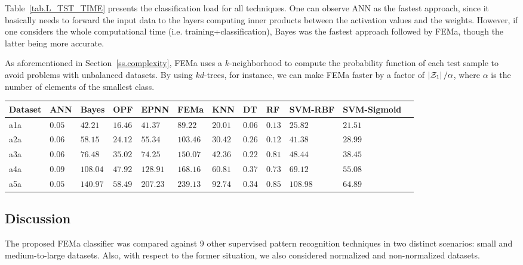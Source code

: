 Table~\ref{tab.L_TST_TIME} presents the classification load for all techniques. One can observe ANN as the fastest approach, since it basically needs to forward the input data to the layers computing inner products between the activation values and the weights. However, if one considers the whole computational time (i.e. training+classification), Bayes was the fastest approach followed by FEMa, though the latter being more accurate.

As aforementioned in Section~\ref{ss.complexity}, FEMa uses a $k$-neighborhood to compute the probability function of each test sample to avoid problems with unbalanced datasets. By using $kd$-trees, for instance, we can make FEMa faster by a factor of $\left|{\cal Z}_1\right|/\alpha$, where $\alpha$ is the number of elements of the smallest class.

\begin{table*}[!htb]
\begin{center}
\caption{\label{tab.L_TST_TIME}Testing time concerning the medium-to-large datasets.}
\scriptsize
\begin{tabular}{l||lllllllllll}
Dataset & ANN   & Bayes     & OPF     & EPNN     & FEMa     & KNN     &      DT  &  RF    & SVM-RBF & SVM-Sigmoid     \\ \hline \hline
a1a& $ 0.05$    & $ 42.21$  & $ 16.46$& $ 41.37$ & $ 89.22$ & $ 20.01$& $0.06$   & $0.13$ & $ 25.82$& $21.51$  \\ 
a2a& $ 0.06$    & $ 58.15$  & $ 24.12$& $ 55.34$ & $ 103.46$& $ 30.42$& $0.26$   & $0.12$ & $ 41.38$& $28.99$ \\ 
a3a& $ 0.06$    & $ 76.48$  & $ 35.02$& $ 74.25$ & $ 150.07$& $ 42.36$& $0.22$   & $0.81$ &$ 48.44$ & $38.45$\\ 
a4a& $ 0.09$    & $ 108.04$ & $ 47.92$& $ 128.91$& $ 168.16$& $ 60.81$& $0.37$   & $0.73$ &$ 69.12$ & $55.08$\\ 
a5a& $ 0.05$    & $ 140.97$ & $ 58.49$& $ 207.23$& $ 239.13$& $ 92.74$& $0.34$   & $0.85$ & $108.98$& $64.89$\\ \hline
\end{tabular}
\end{center}
\end{table*}

\subsection{Discussion}
\label{ss.discussion}

The proposed FEMa classifier was compared against 9 other supervised pattern recognition techniques in two distinct scenarios: small and medium-to-large datasets. Also, with respect to the former situation, we also considered normalized and non-normalized datasets.

